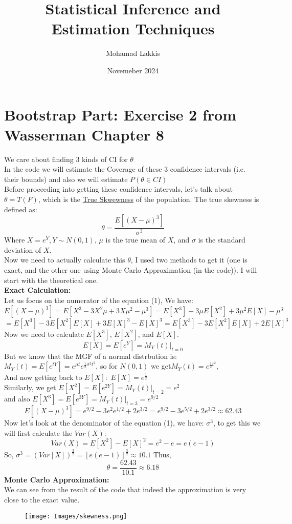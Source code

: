 \documentclass[12pt]{article}
\title{Statistical Inference and Estimation Techniques}
\author{Mohamad Lakkis}
\date{Novemeber 2024}
\begin{document}
\maketitle

\section*{Bootstrap Part: Exercise 2 from Wasserman Chapter 8}
We care about finding 3 kinds of CI for $\theta$\\
In the code we will estimate the Coverage of these 3 confidence intervals (i.e. their bounds) and also we will estimate $P(\theta \in CI)$\\
Before proceeding into getting these confidence intervals, let's talk about $\theta = T(F)$, which is the \underline{True Skwewness} of the population. The true skewness is defined as:
\begin{equation}
  \theta = \frac{E[(X - \mu)^3]}{\sigma^3}
\end{equation}
Where $X = e^{Y}, Y \sim N(0,1)$, $\mu$ is the true mean of $X$, and $\sigma$ is the standard deviation of $X$. \\
Now we need to actually calculate this $\theta$, I used two methods to get it (one is exact, and the other one using Monte Carlo Approximation (in the code)). I will start with the theoretical one. \\
\textbf{Exact Calculation:} \\
Let us focus on the numerator of the equation (1), We have:
\[
  E[(X - \mu)^3] = E[X^3 - 3X^2\mu + 3X\mu^2 - \mu^3] = E[X^3] - 3\mu E[X^2] + 3\mu^2 E[X] - \mu^3
\]
\[
  = E[X^3] - 3E[X^2]E[X] + 3E[X]^3 - E[X]^3  = E[X^3] - 3E[X^2]E[X] + 2E[X]^3
\]
Now we need to calculate $E[X^3]$, $E[X^2]$, and $E[X]$. \\
\[
  E[X] = E[e^Y] = M_Y(t)|_{t=0}
\]
But we know that  the MGF of a normal distrbution is: \\ $M_Y(t) = E[e^{tY}] = e^{\mu t}e^{\frac{1}{2}\sigma^2t^2}$, so for $N(0,1)$ we get$M_Y(t) = e^{\frac{1}{2}t^2}$, \\
And now getting back to $E[X]: $
$E[X] = e^{\frac{1}{2}}$ \\

Similarly, we get $E[X^2] = E[e^{2Y}] = M_Y(t)|_{t=2} = e^2$ \\
and also $E[X^3] = E[e^{3Y}] = M_Y(t)|_{t=3} = e^{9/2}$
\[
  E[(X-\mu)^3] = e^{9/2} - 3e^2e^{1/2} + 2e^{3/2} = e^{9/2} - 3e^{5/2} + 2e^{3/2} \approx 62.43
\]
Now let's look at the denominator of the equation (1), we have: $\sigma^3$, to get this we will first calculate the $Var(X)$:
\[
  Var(X) = E[X^2] - E[X]^2 = e^2 - e = e(e - 1)
\]
So, $\sigma^3 = (Var[X])^{\frac{3}{2}} = [e(e-1)]^{\frac{3}{2}} \approx 10.1$
Thus,
\[
  \theta = \frac{62.43}{10.1} \approx 6.18
\]
\textbf{Monte Carlo Approximation:} \\
We can see from the result of the code that indeed the approximation is very close to the exact value. \\
\begin{figure}[H]
  \centering
  \texttt{[image: Images/skewness.png]}
\end{figure}
\end{document}

